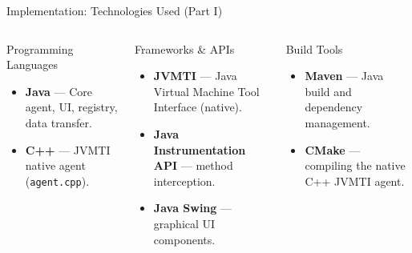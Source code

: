 \documentclass[aspectratio=169]{beamer}
\begin{document}
\begin{frame}{Implementation: Technologies Used (Part I)}
  \begin{columns}[T]
    
      \begin{block}{Programming Languages}
        \begin{itemize}\normalsize\itemsep5pt
          \item \textbf{Java} — Core agent, UI, registry, data transfer.
          \item \textbf{C++} — JVMTI native agent (\texttt{agent.cpp}).
        \end{itemize}
      \end{block}
      
      \vspace{2pt}
      
      \begin{block}{Frameworks \& APIs}
        \begin{itemize}\normalsize\itemsep5pt
          \item \textbf{JVMTI} — Java Virtual Machine Tool Interface (native).
          \item \textbf{Java Instrumentation API} — method interception.
          \item \textbf{Java Swing} — graphical UI components.
        \end{itemize}
      \end{block}
    
      \begin{block}{Build Tools}
        \begin{itemize}\normalsize\itemsep5pt
          \item \textbf{Maven} — Java build and dependency management.
          \item \textbf{CMake} — compiling the native C++ JVMTI agent.
        \end{itemize}
      \end{block}

  \end{columns}
\end{frame}
\end{document}
